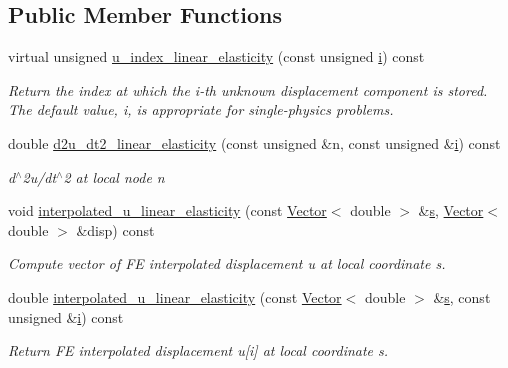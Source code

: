 \subsection*{Public Member Functions}
\begin{DoxyCompactItemize}
\item 
virtual unsigned \hyperlink{classoomph_1_1LinearElasticityEquationsBase_aec3153c5808fd1259062b2983013e7f4}{u\+\_\+index\+\_\+linear\+\_\+elasticity} (const unsigned \hyperlink{cfortran_8h_adb50e893b86b3e55e751a42eab3cba82}{i}) const
\begin{DoxyCompactList}\small\item\em Return the index at which the i-\/th unknown displacement component is stored. The default value, i, is appropriate for single-\/physics problems. \end{DoxyCompactList}\item 
double \hyperlink{classoomph_1_1LinearElasticityEquationsBase_af281baa2a69dd8c52678dc04e4273ff0}{d2u\+\_\+dt2\+\_\+linear\+\_\+elasticity} (const unsigned \&n, const unsigned \&\hyperlink{cfortran_8h_adb50e893b86b3e55e751a42eab3cba82}{i}) const
\begin{DoxyCompactList}\small\item\em d$^\wedge$2u/dt$^\wedge$2 at local node n \end{DoxyCompactList}\item 
void \hyperlink{classoomph_1_1LinearElasticityEquationsBase_aa3c8cbe3665235f44a8bc497d593f0da}{interpolated\+\_\+u\+\_\+linear\+\_\+elasticity} (const \hyperlink{classoomph_1_1Vector}{Vector}$<$ double $>$ \&\hyperlink{cfortran_8h_ab7123126e4885ef647dd9c6e3807a21c}{s}, \hyperlink{classoomph_1_1Vector}{Vector}$<$ double $>$ \&disp) const
\begin{DoxyCompactList}\small\item\em Compute vector of FE interpolated displacement u at local coordinate s. \end{DoxyCompactList}\item 
double \hyperlink{classoomph_1_1LinearElasticityEquationsBase_a5e3f41d1c36a8ebc0a90ed7cbe230c75}{interpolated\+\_\+u\+\_\+linear\+\_\+elasticity} (const \hyperlink{classoomph_1_1Vector}{Vector}$<$ double $>$ \&\hyperlink{cfortran_8h_ab7123126e4885ef647dd9c6e3807a21c}{s}, const unsigned \&\hyperlink{cfortran_8h_adb50e893b86b3e55e751a42eab3cba82}{i}) const
\begin{DoxyCompactList}\small\item\em Return FE interpolated displacement u\mbox{[}i\mbox{]} at local coordinate s. \end{DoxyCompactList}\item 

\end{DoxyCompactItemize}
